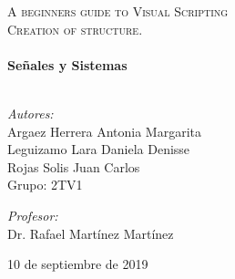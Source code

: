 \documentclass[10pt]{article}
\begin{document}
\begin{center}
\textsc{\LARGE A beginners guide to Visual Scripting}\\[1.5cm]													%

\textsc{\Large Creation of structure.}\\[0.5cm]

 			\vspace*{1cm}																		%
\HRule \\[0.4cm]																	%
{ \huge \bfseries Señales y Sistemas}\\[0.4cm]	%
\HRule \\[1.5cm]																	%
\begin{minipage}{0.4\textwidth}													%
\begin{flushleft} \large															
\textit{Autores:}\\
Argaez Herrera Antonia Margarita\\
Leguizamo Lara Daniela Denisse\\
Rojas Solis Juan Carlos\\
Grupo: 2TV1\\
\end{flushleft}																		%
\end{minipage}		
\begin{minipage}{0.5\textwidth}		
\vspace{-0.6cm}											%
\begin{flushright} \large															%
\textit{Profesor:} \\
Dr. Rafael Martínez Martínez																%
\end{flushright}																	%
\end{minipage}	
\vspace*{1cm}

\vspace{2cm} 																				
\begin{center}																					
{\large 10 de septiembre de 2019}																	%
 			\end{center}												  						
\end{center}							 											
																					
\newpage																		

\tableofcontents 

\newpage
\end{document}
